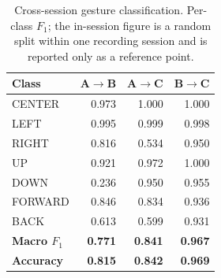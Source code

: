 \begin{table}[t]
\caption{Cross-session gesture classification. Per-class $F_1$; the in-session figure is a random split within one recording session and is reported only as a reference point.}
\label{tab:crosssession}
\centering
\footnotesize
\setlength{\tabcolsep}{4pt}
\renewcommand{\arraystretch}{1.02}
\begin{tabular}{@{}lrrr@{}}
\toprule
Class & A$\rightarrow$B & A$\rightarrow$C & B$\rightarrow$C \\
\midrule
CENTER & 0.973 & 1.000 & 1.000 \\
LEFT & 0.995 & 0.999 & 0.998 \\
RIGHT & 0.816 & 0.534 & 0.950 \\
UP & 0.921 & 0.972 & 1.000 \\
DOWN & 0.236 & 0.950 & 0.955 \\
FORWARD & 0.846 & 0.834 & 0.936 \\
BACK & 0.613 & 0.599 & 0.931 \\
\midrule
\textbf{Macro $F_1$} & \textbf{0.771} & \textbf{0.841} & \textbf{0.967}\\
\textbf{Accuracy} & \textbf{0.815} & \textbf{0.842} & \textbf{0.969}\\
\bottomrule
\end{tabular}
\end{table}
